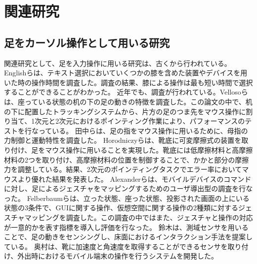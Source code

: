 \chapter{関連研究}

\section{足をカーソル操作として用いる研究}
関連研究として、足を入力操作に用いる研究は、古くから行われている。Englishら\cite{1698228}は、テキスト選択においていくつかの膝を含めた装置やデバイスを用いた時の操作時間を調査した。調査の結果、膝による操作は最も短い時間で選択することができることがわかった。
近年でも、調査が行われている。Vellosoら\cite{velloso:hal-01599657}は、座っている状態の机の下の足の動きの特徴を調査した。この論文の中で、机の下に配置したトラッキングシステムから、片方の足のつま先をマウス操作に割り当て、1次元と2次元におけるポインティング作業により、パフォーマンスのテストを行なっている。
田中ら\cite{110004704997}は、足の指をマウス操作に用いるために、母指の力制御と運動特性を調査した。
Horodniczyら\cite{Horodniczy:2017:FHE:3025453.3025625}は、靴底に可変摩擦式の装置を取り付け、足をマウス操作に用いることを実現した。靴底には低摩擦材料と高摩擦材料の2つを取り付け、高摩擦材料の位置を制御することで、かかと部分の摩擦力を調整している。結果、2次元のポインティングタスクでエラー率においてマウスより優れた結果を発表した。
Alexanderら\cite{Alexander:2012:PYB:2207676.2208575}は、モバイルデバイスのコマンドに対し、足によるジェスチャをマッピングするためのユーザ導出型の調査を行なった。
Felberbaumら\cite{Felberbaum:2018:BUF:3173574.3173908}は、立った状態、座った状態、投影された画面の上にいる状態の3条件で、GUIに関する操作、仮想空間に関する操作の2種類に対するジェスチャマッピングを調査した。この調査の中ではまた、ジェスチャと操作の対応が一意的かを表す指標を導入し評価を行なった。
鈴木\cite{ssuzuki_2009}は、測域センサを用いることで、足の動きをセンシングし、床面におけるインタラクション手法を提案している。
奥村\cite{okumura_2011}は、靴に加速度と角速度を取得することができるセンサを取り付け、外出時におけるモバイル端末の操作を行うシステムを開発した。

